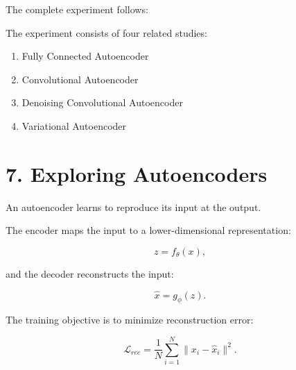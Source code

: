 \documentclass[10pt]{article}
\begin{document}
The complete experiment follows:

\begin{center}
\end{center}

The experiment consists of four related studies:

\begin{enumerate}
\item Fully Connected Autoencoder
\item Convolutional Autoencoder
\item Denoising Convolutional Autoencoder
\item Variational Autoencoder
\end{enumerate}

\section*{7. Exploring Autoencoders}

An autoencoder learns to reproduce its input at the output.

The encoder maps the input to a lower-dimensional representation:

\[
z=f_{\theta}(x),
\]

and the decoder reconstructs the input:

\[
\hat{x}=g_{\phi}(z).
\]

The training objective is to minimize reconstruction error:

\[
\mathcal{L}_{rec}
=
\frac{1}{N}\sum_{i=1}^{N}
\|x_i-\hat{x}_i\|^2.
\]

\begin{center}
\end{center}
\end{document}
